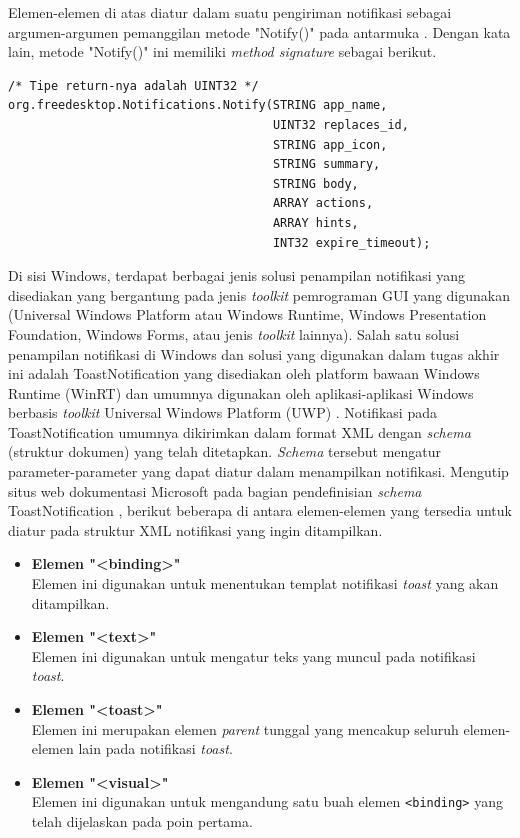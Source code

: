Elemen-elemen di atas diatur dalam suatu pengiriman notifikasi sebagai argumen-argumen pemanggilan metode "Notify()" pada antarmuka . Dengan kata lain, metode "Notify()" ini memiliki \textit{method signature} sebagai berikut.
\begin{lstlisting}
/* Tipe return-nya adalah UINT32 */
org.freedesktop.Notifications.Notify(STRING app_name,
                                     UINT32 replaces_id,
                                     STRING app_icon,
                                     STRING summary,
                                     STRING body,
                                     ARRAY actions,
                                     ARRAY hints,
                                     INT32 expire_timeout);
\end{lstlisting}

Di sisi Windows, terdapat berbagai jenis solusi penampilan notifikasi yang disediakan yang bergantung pada jenis \textit{toolkit} pemrograman GUI yang digunakan (Universal Windows Platform atau Windows Runtime, Windows Presentation Foundation, Windows Forms, atau jenis \textit{toolkit} lainnya). Salah satu solusi penampilan notifikasi di Windows dan solusi yang digunakan dalam tugas akhir ini adalah ToastNotification yang disediakan oleh platform bawaan Windows Runtime (WinRT) dan umumnya digunakan oleh aplikasi-aplikasi Windows berbasis \textit{toolkit} Universal Windows Platform (UWP) \cite{microsoft-toast-notification-overview}. Notifikasi pada ToastNotification umumnya dikirimkan dalam format XML dengan \textit{schema} (struktur dokumen) yang telah ditetapkan. \textit{Schema} tersebut mengatur parameter-parameter yang dapat diatur dalam menampilkan notifikasi. Mengutip situs web dokumentasi Microsoft pada bagian pendefinisian \textit{schema} ToastNotification \cite{microsoft-toast-notification-schema}, berikut beberapa di antara elemen-elemen yang tersedia untuk diatur pada struktur XML notifikasi yang ingin ditampilkan.

\begin{itemize}
    \item \textbf{Elemen "<binding>"}\\
    Elemen ini digunakan untuk menentukan templat notifikasi \textit{toast} yang akan ditampilkan.
    
    \item \textbf{Elemen "<text>"}\\
    Elemen ini digunakan untuk mengatur teks yang muncul pada notifikasi \textit{toast}.
    
    \item \textbf{Elemen "<toast>"}\\
    Elemen ini merupakan elemen \textit{parent} tunggal yang mencakup seluruh elemen-elemen lain pada notifikasi \textit{toast}.
    
    \item \textbf{Elemen "<visual>"}\\
    Elemen ini digunakan untuk mengandung satu buah elemen \verb|<binding>| yang telah dijelaskan pada poin pertama.
\end{itemize}


